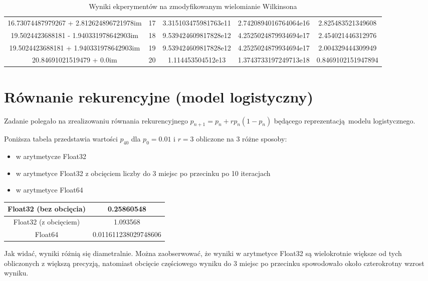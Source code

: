 \documentclass{article}
\begin{document}
\begin{table}[!htpb]
\begin{adjustbox}{center}
\begin{tabular}{| c | c | c | c | c |}
    16.73074487979267 + 2.812624896721978im & 17 & 3.315103475981763e11 & 2.7420894016764064e16 & 2.825483521349608\\
    19.5024423688181 - 1.940331978642903im & 18 & 9.539424609817828e12 & 4.2525024879934694e17 & 2.454021446312976\\
    19.5024423688181 + 1.940331978642903im & 19 & 9.539424609817828e12 & 4.2525024879934694e17 & 2.004329444309949\\
    20.84691021519479 + 0.0im & 20 & 1.114453504512e13 & 1.3743733197249713e18 & 0.8469102151947894\\
    \hline
  \end{tabular}
\end{adjustbox}

  \caption{Wyniki ekperymentów na zmodyfikowanym wielomianie Wilkinsona}
  \label{wilkinsonchange}
\end{table}

\section{Równanie rekurencyjne (model logistyczny)}

Zadanie polegało na zrealizowaniu równania rekurencyjnego $p_{n+1} = p_n + rp_n(1-p_n)$ będącego reprezentacją modelu logistycznego.

Poniższa tabela przedstawia wartości $p_40$ dla $p_0=0.01$ i $r=3$ obliczone na 3 różne sposoby:
\begin{itemize}
  \item w arytmetycze Float32
  \item w arytmetyce Float32 z obcięciem liczby do 3 miejsc po przecinku po 10 iteracjach
  \item w arytmetyce Float64
\end{itemize}

\begin{center}
  \begin{tabular}{| c | c |}
    \hline
    Float32 (bez obcięcia) & 0.25860548\\
    \hline
    Float32 (z obcięciem) & 1.093568\\
    \hline
    Float64 & 0.011611238029748606\\
    \hline
  \end{tabular}
\end{center}

Jak widać, wyniki różnią się diametralnie.
Można zaobserwować, że wyniki w arytmetyce Float32 są wielokrotnie większe od tych obliczonych z większą precyzją,
natomiast obcięcie częściowego wyniku do 3 miejsc po przecinku spowodowało około czterokrotny wzrost wyniku.
\end{document}
